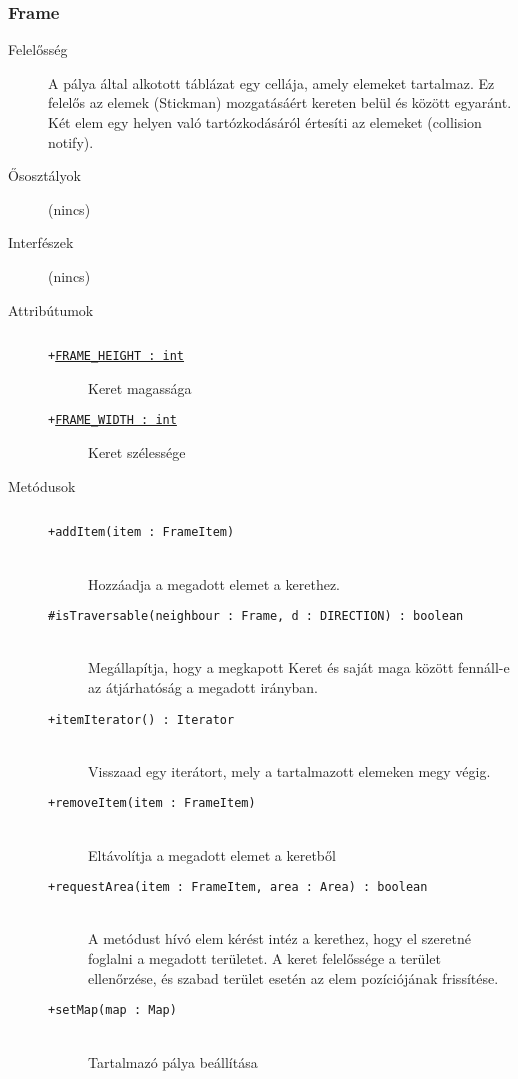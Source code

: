 		\subsubsection{Frame}
			\begin{description}

				\item[Felelősség] A pálya által alkotott táblázat egy cellája, amely elemeket tartalmaz. Ez felelős az elemek (Stickman) mozgatásáért kereten belül és között egyaránt. Két elem egy helyen való tartózkodásáról értesíti az elemeket (collision notify).

				\item[Ősosztályok] (nincs)
				\item[Interfészek] (nincs)
				\item[Attribútumok]$\ $
					\begin{description}
						\item[\texttt{+\underline{FRAME\_HEIGHT : int}}]Keret magassága
						\item[\texttt{+\underline{FRAME\_WIDTH : int}}]Keret szélessége
					\end{description}
				\item[Metódusok]$\ $
					\begin{description}
						\item[\texttt{+addItem(item : FrameItem)}] \hfill \\Hozzáadja a megadott elemet a kerethez. 
						\item[\texttt{\#isTraversable(neighbour : Frame, d : DIRECTION) : boolean}] \hfill \\Megállapítja, hogy a megkapott Keret és saját  maga között fennáll-e az átjárhatóság a  megadott irányban. 
						\item[\texttt{+itemIterator() : Iterator}] \hfill \\Visszaad egy iterátort, mely a tartalmazott  elemeken megy végig. 
						\item[\texttt{+removeItem(item : FrameItem)}] \hfill \\Eltávolítja a megadott elemet a keretből 
						\item[\texttt{+requestArea(item : FrameItem, area : Area) : boolean}] \hfill \\A metódust hívó elem kérést intéz a kerethez,  hogy el szeretné foglalni a megadott területet.  A keret felelőssége a terület ellenőrzése, és szabad  terület esetén az elem pozíciójának frissítése. 
						\item[\texttt{+setMap(map : Map)}] \hfill \\Tartalmazó pálya beállítása 
					\end{description}
			\end{description}


